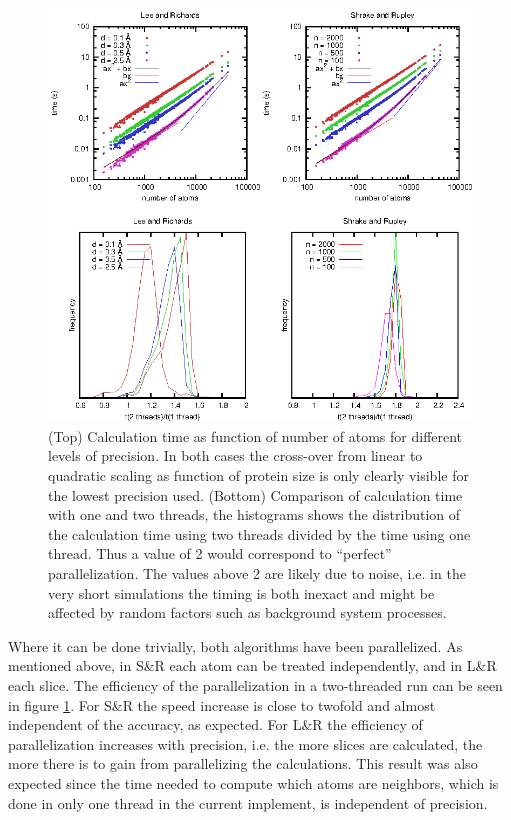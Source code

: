 \documentclass[a4paper,11pt]{article}
\begin{document}
\begin{figure}
  \begin{center}
  \includegraphics{../analysis/plots/time}
  \caption{(Top) Calculation time as function of number of atoms for
    different levels of precision. In both cases the cross-over from
    linear to quadratic scaling as function of protein size is only
    clearly visible for the lowest precision used.  (Bottom)
    Comparison of calculation time with one and two threads, the
    histograms shows the distribution of the calculation time using
    two threads divided by the time using one thread. Thus a value of
    2 would correspond to ``perfect'' parallelization. The values
    above 2 are likely due to noise, i.e. in the very short
    simulations the timing is both inexact and might be affected by
    random factors such as background system processes.
    \label{fig:time}}
  \end{center}
\end{figure}

Where it can be done trivially, both algorithms have been
parallelized. As mentioned above, in S\&R each atom can be treated
independently, and in L\&R each slice. The efficiency of the
parallelization in a two-threaded run can be seen in figure
\ref{fig:time}. For S\&R the speed increase is close to twofold and
almost independent of the accuracy, as expected. For L\&R the
efficiency of parallelization increases with precision, i.e. the more
slices are calculated, the more there is to gain from parallelizing
the calculations. This result was also expected since the time needed
to compute which atoms are neighbors, which is done in only one thread
in the current implement, is independent of precision.
\end{document}
